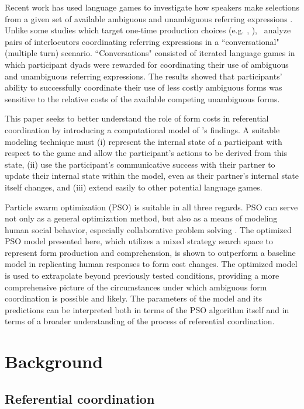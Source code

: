 \documentclass[a4paper,11pt]{article}
\begin{document}
Recent work has used language games to investigate how speakers make selections from a given set of available ambiguous and unambiguous referring expressions \cite{rohde2012,degen2012,frank2012}. Unlike some studies which target one-time production choices (e.g. \citeauthor{degen2012}, ), \citeauthor{rohde2012}\ analyze pairs of interlocutors coordinating referring expressions in a ``conversational" (multiple turn) scenario. ``Conversations" consisted of iterated language games in which participant dyads were rewarded for coordinating their use of ambiguous and unambiguous referring expressions. The results showed that participants' ability to successfully coordinate their use of less costly ambiguous forms was sensitive to the relative costs of the available competing unambiguous forms. 

This paper seeks to better understand the role of form costs in referential coordination by introducing a computational model of \citeauthor{rohde2012}'s findings. A suitable modeling technique must (i) represent the internal state of a participant with respect to the game and allow the participant's actions to be derived from this state, (ii) use the participant's communicative success with their partner to update their internal state within the model, even as their partner's internal state itself changes, and (iii) extend easily to other potential language games. 

Particle swarm optimization (PSO) is suitable in all three regards. PSO can serve not only as a general optimization method, but also as a means of modeling human social behavior, especially collaborative problem solving \cite{kennedy1997}. The optimized PSO model presented here, which utilizes a mixed strategy search space to represent form production and comprehension, is shown to outperform a baseline model in replicating human responses to form cost changes. The optimized model is used to extrapolate beyond previously tested conditions, providing a more comprehensive picture of the circumstances under which ambiguous form coordination is possible and likely. The parameters of the model and its predictions can be interpreted both in terms of the PSO algorithm itself and in terms of a broader understanding of the process of referential coordination.


\section{Background}
\subsection{Referential coordination}
\end{document}
